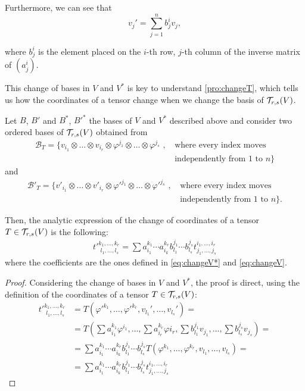 Furthermore, we can see that
\begin{equation}
	\label{eq:changeV}
	v_j' = \sum_{j=1}^n b_j^i v_j,
\end{equation}

where $b_j^i$ is the element placed on the $i$-th row, $j$-th column of  the inverse matrix of $(a^i_j)$.

This change of bases in $V$ and $V^*$  is key to understand \autoref{pro:changeT}, which tells us how  the coordinates of a tensor change when we change the basis of ${\mathcal T}_{r,s}(V)$.

\begin{proposition}
	\label{pro:changeT}
	Let $B$, $B'$ and $B^*$, $B'^*$ the bases of $V$ and $V^*$ described above and consider two ordered bases of ${\mathcal T}_{r,s}(V)$ obtained from
	\begin{align*}
		\mathcal{B}_T = \{v_{i_1} \otimes \dots \otimes v_{i_r} \otimes \varphi^{j_1} \otimes \dots \otimes \varphi^{j_s} \textrm{ , } &\textrm{where every index moves} \\
		&\textrm{independently from $1$ to $n$}  \}
	\end{align*}
	and
	\begin{align*}
		\mathcal{B}'_T = \{v'_{i_1} \otimes \dots \otimes v'_{i_r} \otimes \varphi'^{j_1} \otimes \dots \otimes \varphi'^{j_s} \textrm{ , } &\textrm{where every index moves} \\
		&\textrm{independently from $1$ to $n$}  \}.
	\end{align*}

	Then, the analytic expression of the change of coordinates of a tensor $T \in {\mathcal T}_{r,s}(V)$ is the following:
	\begin{align*}
		t'^{k_1,\dots,k_r}_{\phantom{'}l_1,\dots,l_s} = \sum a_{i_1}^{k_1} \cdots a_{i_k}^{k_r} b_{l_1}^{j_1} \cdots b_{l_s}^{j_s} t_{j_1,\dots,j_s}^{i_1,\dots,i_r}
	\end{align*}
	where the coefficients are the ones defined in \autoref{eq:changeV*} and \autoref{eq:changeV}.
\end{proposition}

\begin{proof}
	Considering the change of bases in $V$ and $V^*$, the proof is direct, using the definition of the coordinates of a tensor $T \in {\mathcal T}_{r,s}(V)$:
	\begin{align*}
		t'^{k_1,\dots,k_r}_{\phantom{'}l_1,\dots,l_s} &= T(\varphi'^{k_1}, \dots, \varphi'^{k_r}, v_{l_1}', \dots, v_{l_s}')  = \\
		&= T(\sum a_{i_1}^{k_1}\varphi^{i_1}, \dots, \sum a_{i_r}^{k_r}\varphi{i_r}, \sum b_{l_1}^{j_1} v_{j_1}, \dots, \sum b_{l_s}^{j_s} v_{j_s}) = \\
		&= \sum a_{i_1}^{k_1} \cdots a_{i_k}^{k_r} b_{l_1}^{j_1} \cdots b_{l_s}^{j_s} T(\varphi^{k_1}, \dots, \varphi^{k_r}, v_{l_1}, \dots, v_{l_s}) = \\
		&= \sum a_{i_1}^{k_1} \cdots a_{i_k}^{k_r} b_{l_1}^{j_1} \cdots b_{l_s}^{j_s} t_{j_1,\dots,j_s}^{i_1,\dots,i_r}
	\end{align*}
\end{proof}

